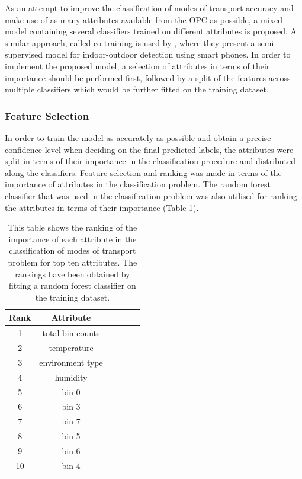 \documentclass[bsc,frontabs,twoside,singlespacing,parskip,deptreport]{infthesis}     %
\begin{document}
As an attempt to improve the classification of modes of transport accuracy and make use of as many attributes available from the OPC as possible, a mixed model containing several classifiers trained on different attributes is proposed. A similar approach, called co-training is used by \cite{Radu2014}, where they present a semi-supervised model for indoor-outdoor detection using smart phones. In order to implement the proposed model, a selection of attributes in terms of their importance should be performed first, followed by a split of the features across multiple classifiers which would be further fitted on the training dataset.


\subsubsection{Feature Selection}
\label{subsubsec:feat-selection}

In order to train the model as accurately as possible and obtain a precise confidence level when deciding on the final predicted labels, the attributes were split in terms of their importance in the classification procedure and distributed along the classifiers. Feature selection and ranking was made in terms of the importance of attributes in the classification problem. The random forest classifier that was used in the classification problem was also utilised for ranking the attributes in terms of their importance (Table \ref{table:attr-rank}).

\begin{table}[h!]
\centering
 \begin{tabular}{||c | c | c | c | c | c||} 
 \hline
 Rank & Attribute \\ [0.5ex] 
 \hline\hline
 1 & total bin counts \\ 
 \hline
 2 &  temperature \\
 \hline
 3 &  environment type \\
  \hline
 4 &  humidity \\
  \hline
 5 &  bin 0 \\
  \hline
 6 &  bin 3 \\
  \hline
 7 &  bin 7 \\
 \hline
 8 & bin 5 \\
  \hline
 9 &  bin 6 \\ 
  \hline
 10 &  bin 4 \\
 \hline
 
\end{tabular}
\caption{This table shows the ranking of the importance of each attribute in the classification of modes of transport problem for top ten attributes. The rankings have been obtained by fitting a random forest classifier on the training dataset.}
\label{table:attr-rank}
\end{table}
\end{document}
